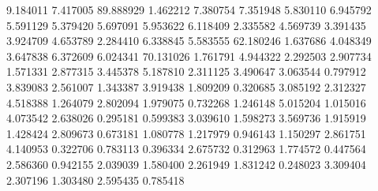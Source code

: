 9.184011
7.417005
89.888929
1.462212
7.380754
7.351948
5.830110
6.945792
5.591129
5.379420
5.697091
5.953622
6.118409
2.335582
4.569739
3.391435
3.924709
4.653789
2.284410
6.338845
5.583555
62.180246
1.637686
4.048349
3.647838
6.372609
6.024341
70.131026
1.761791
4.944322
2.292503
2.907734
1.571331
2.877315
3.445378
5.187810
2.311125
3.490647
3.063544
0.797912
3.839083
2.561007
1.343387
3.919438
1.809209
0.320685
3.085192
2.312327
4.518388
1.264079
2.802094
1.979075
0.732268
1.246148
5.015204
1.015016
4.073542
2.638026
0.295181
0.599383
3.039610
1.598273
3.569736
1.915919
1.428424
2.809673
0.673181
1.080778
1.217979
0.946143
1.150297
2.861751
4.140953
0.322706
0.783113
0.396334
2.675732
0.312963
1.774572
0.447564
2.586360
0.942155
2.039039
1.580400
2.261949
1.831242
0.248023
3.309404
2.307196
1.303480
2.595435
0.785418
